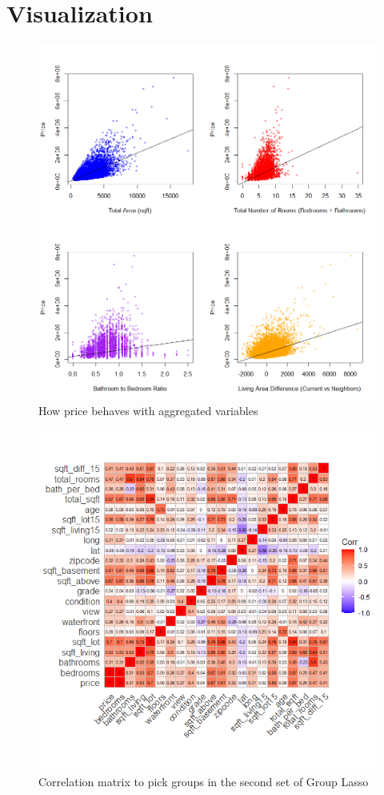 \documentclass[a4paper, 9pt]{article}
\begin{document}
\section{Visualization}
\begin{figure}[h]
\includegraphics[scale=0.6]{corrplots}
\centering
\caption{How price behaves with aggregated variables}
\label{fig:corrplots}
\end{figure}

\begin{figure}[H]
\includegraphics[scale=0.8]{corrmatplot}
\centering
\caption{Correlation matrix to pick groups in the second set of Group Lasso}
\label{fig:corrmatplot}
\end{figure}
\end{document}
